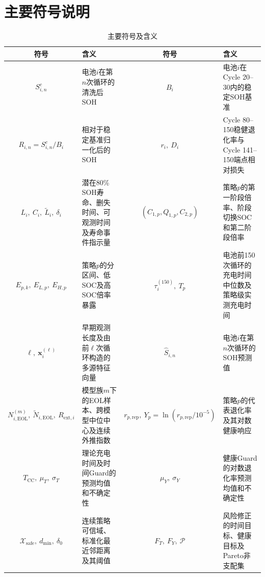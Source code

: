 \documentclass[withoutpreface]{cumcmthesis}
\begin{document}
\section{主要符号说明}
\begin{table}[H]
\centering
\caption{主要符号及含义}
\label{tab:main_symbols}
\small
\setlength{\tabcolsep}{2pt}
{ %
\renewcommand{\arraystretch}{0.95} %
\begin{tabularx}{\textwidth}{cXcX}
\toprule
符号 & 含义 & 符号 & 含义 \\
\midrule

$S^c_{i,n}$
& 电池$i$在第$n$次循环的清洗后SOH
& $B_i$
& 电池$i$在Cycle 20--30内的稳定SOH基准 \\

$R_{i,n}=S^c_{i,n}/B_i$
& 相对于稳定基准归一化后的SOH
& $r_i,\ D_i$
& Cycle 80--150稳健退化率与Cycle 141--150端点相对损失 \\

$L_i,\ C_i,\ \widetilde L_i,\ \delta_i$
& 潜在80\% SOH寿命、删失时间、可观测时间及寿命事件指示量
& $(C_{1,p},Q_{1,p},C_{2,p})$
& 策略$p$的第一阶段倍率、阶段切换SOC和第二阶段倍率 \\

$E_{p,k},\ E_{L,p},\ E_{H,p}$
& 策略$p$的分区间、低SOC及高SOC倍率暴露
& $\tau_i^{(150)},\ T_p$
& 电池前150次循环的充电时间中位数及策略级实测充电时间 \\

$\ell,\ \boldsymbol{x}_i^{(\ell)}$
& 早期观测长度及由前$\ell$次循环构造的多源特征向量
& $\widehat S_{i,n}$
& 电池$i$在第$n$次循环的SOH预测值 \\

$N_{i,\mathrm{EOL}}^{(m)},\
 \widetilde N_{i,\mathrm{EOL}},\
 R_{\mathrm{ext},i}$
& 模型族$m$下的EOL样本、跨模型中位中心及连续外推指数
& $r_{p,\mathrm{rep}},\
 Y_p=\ln(r_{p,\mathrm{rep}}/10^{-5})$
& 策略$p$的代表退化率及其对数健康响应 \\

$T_{\mathrm{CC}},\ \mu_T,\ \sigma_T$
& 理论充电时间及时间Guard的预测均值和不确定性
& $\mu_Y,\ \sigma_Y$
& 健康Guard的对数退化率预测均值和不确定性 \\

$\mathcal X_{\mathrm{safe}},\
 d_{\min},\ \delta_0$
& 连续策略可信域、标准化最近邻距离及其阈值
& $F_T,\ F_Y,\ \mathcal P$
& 风险修正的时间目标、健康目标及Pareto非支配集 \\

\bottomrule
\end{tabularx}
}%
\end{table}
\end{document}
